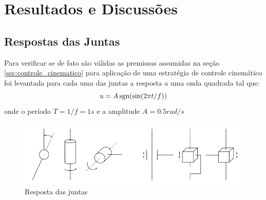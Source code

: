 \chapter{Resultados e Discussões}

\section{Respostas das Juntas}
Para verificar se de fato são válidas as premissas assumidas na seção \ref{sec:controle_cinematico} para aplicação de uma estratégia de controle cinemático foi levantada para cada uma das juntas a resposta a uma onda quadrada tal que:
\[ u = A \operatorname{sgn}(\sin( 2\pi t/f)) \]
onde o período $T = 1/f = 1s$ e a amplitude $A = 0.5 rad/s$

\newlength{\imageheight}
\begin{figure}[!ht]
  \centering
    \includegraphics[width=\textwidth, clip=true, trim = 0 0.5\imageheight 0 0 0 mm]{./img/joints}
  \caption{Resposta das juntas}
\end{figure}


